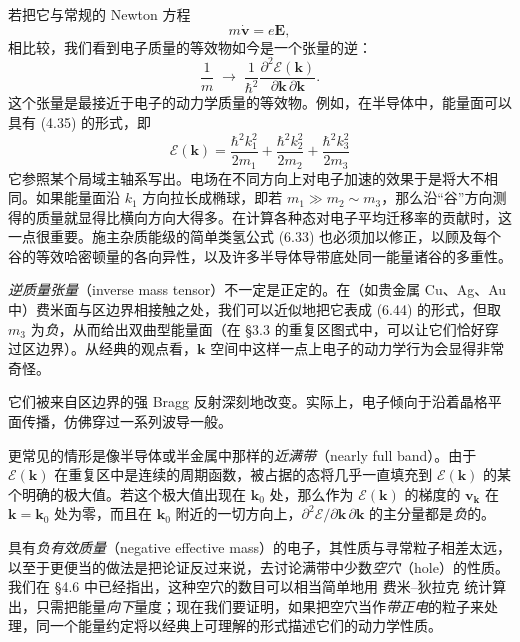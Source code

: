 若把它与常规的 Newton 方程
\begin{equation*}
m\dot{\mathbf{v}}=e\mathbf{E}, \tag{6.42}
\end{equation*}
相比较，我们看到电子质量的等效物如今是一个张量的逆：
\begin{equation*}
\frac{1}{m}\;\rightarrow\;\frac{1}{\hbar^{2}}\frac{\partial^{2}\mathcal{E}(\mathbf{k})}{\partial\mathbf{k}\,\partial\mathbf{k}}. \tag{6.43}
\end{equation*}
这个张量是最接近于电子的动力学质量的等效物。例如，在半导体中，能量面可以具有 (4.35) 的形式，即
\begin{equation*}
\mathcal{E}(\mathbf{k})=\frac{\hbar^{2}k_{1}^{2}}{2m_{1}}+\frac{\hbar^{2}k_{2}^{2}}{2m_{2}}+\frac{\hbar^{2}k_{3}^{2}}{2m_{3}} \tag{6.44}
\end{equation*}
它参照某个局域主轴系写出。电场在不同方向上对电子加速的效果于是将大不相同。如果能量面沿 $k_{1}$ 方向拉长成椭球，即若 $m_{1}\gg m_{2}\sim m_{3}$，那么沿“谷”方向测得的质量就显得比横向方向大得多。在计算各种态对电子平均迁移率的贡献时，这一点很重要。施主杂质能级的简单类氢公式 (6.33) 也必须加以修正，以顾及每个谷的等效哈密顿量的各向异性，以及许多半导体导带底处同一能量诸谷的多重性。

\emph{逆质量张量}（inverse mass tensor）不一定是正定的。在（如贵金属 Cu、Ag、Au 中）费米面与区边界相接触之处，我们可以近似地把它表成 (6.44) 的形式，但取 $m_{3}$ 为\emph{负}，从而给出双曲型能量面（在 §3.3 的重复区图式中，可以让它们恰好穿过区边界）。从经典的观点看，$\mathbf{k}$ 空间中这样一点上电子的动力学行为会显得非常奇怪。

它们被来自区边界的强 Bragg 反射深刻地改变。实际上，电子倾向于沿着晶格平面传播，仿佛穿过一系列波导一般。



更常见的情形是像半导体或半金属中那样的\emph{近满带}（nearly full band）。由于 $\mathcal{E}(\mathbf{k})$ 在重复区中是连续的周期函数，被占据的态将几乎一直填充到 $\mathcal{E}(\mathbf{k})$ 的某个明确的极大值。若这个极大值出现在 $\mathbf{k}_{0}$ 处，那么作为 $\mathcal{E}(\mathbf{k})$ 的梯度的 $\mathbf{v}_{\mathbf{k}}$ 在 $\mathbf{k}=\mathbf{k}_{0}$ 处为零，而且在 $\mathbf{k}_{0}$ 附近的一切方向上，$\partial^{2}\mathcal{E}/\partial\mathbf{k}\,\partial\mathbf{k}$ 的主分量都是\emph{负}的。

具有\emph{负有效质量}（negative effective mass）的电子，其性质与寻常粒子相差太远，以至于更便当的做法是把论证反过来说，去讨论满带中少数\emph{空穴}（hole）的性质。我们在 §4.6 中已经指出，这种空穴的数目可以相当简单地用 费米–狄拉克 统计算出，只需把能量\emph{向下}量度；现在我们要证明，如果把空穴当作\emph{带正电}的粒子来处理，同一个能量约定将以经典上可理解的形式描述它们的动力学性质。

